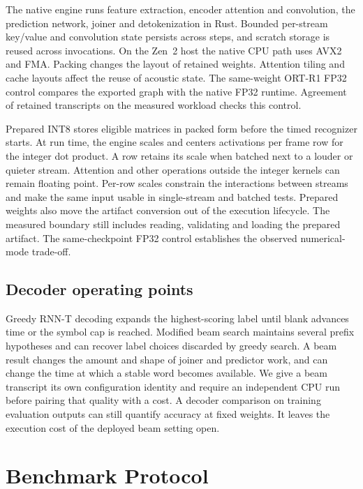 \documentclass[conference]{IEEEtran}
\begin{document}
The native engine runs feature extraction, encoder attention and convolution,
the prediction network, joiner and detokenization in Rust. Bounded per-stream
key/value and convolution state persists across steps, and scratch storage is
reused across invocations. On the Zen~2 host the native CPU path uses AVX2
and FMA. Packing changes the layout of retained weights. Attention tiling and
cache layouts affect the reuse of acoustic state. The same-weight
ORT-R1 FP32 control compares the exported graph with the native FP32
runtime. Agreement of retained transcripts on the measured workload
checks this control.

Prepared INT8 stores eligible matrices in packed form before the timed
recognizer starts. At run time, the engine scales and centers activations per
frame row for the integer dot product. A row retains its scale when batched
next to a louder or quieter stream. Attention and other operations outside
the integer kernels can remain floating point. Per-row scales constrain the
interactions between streams and make the same input usable in single-stream
and batched tests. Prepared weights also move the artifact conversion out of
the execution lifecycle. The measured boundary still includes reading,
validating and loading the prepared artifact. The same-checkpoint FP32
control establishes the observed numerical-mode trade-off.

\subsection{Decoder operating points}

Greedy RNN-T decoding expands the highest-scoring label until blank advances
time or the symbol cap is reached. Modified beam search maintains several
prefix hypotheses and can recover label choices discarded by greedy search.
A beam result changes the amount and shape of joiner and predictor work,
and can change the time at which a stable word becomes available. We give a
beam transcript its own configuration identity and require an independent
CPU run before pairing that quality with a cost. A decoder comparison on
training evaluation outputs can still quantify accuracy at fixed weights.
It leaves the execution cost of the deployed beam setting open.

\section{Benchmark Protocol}
\label{sec:protocol}
\end{document}
